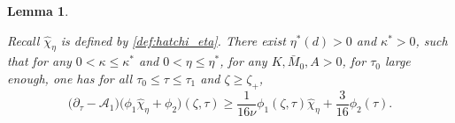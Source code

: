 \documentclass[11pt]{aims}
\newtheorem{lemma}[theorem]{Lemma}
\theoremstyle{definition}
\newcommand{\As}{\mathscr{A}}
\newcommand{\pa}{\partial}
\numberwithin{equation}{section}
\begin{document}
\begin{lemma} \label{lem:supersolutionmain}

Recall $ \hat \chi_{\eta}$ is defined by \eqref{def:hatchi_eta}. There exist $\eta^*(d)>0$ and $\kappa^*>0$, such that for any $0<\kappa\leq \kappa^*$ and $0<\eta\leq \eta^*$, for any $K,\bar M_0,A>0$, for $\tau_0$ large enough, one has for all $ \tau_0\leq \tau \leq \tau_1$ and $\zeta \geq  \zeta_+$,
\begin{equation}\label{est:Linearterms1}
\big( \pa_\tau - \As_1\big) \big(\phi_1 \hat \chi_{\eta}+ \phi_2 \big)(\zeta,\tau)  \geq  \frac{1}{16 \nu}\phi_1(\zeta, \tau) \hat \chi_{\eta} + \frac{3}{16}\phi_2(\tau).
\end{equation}

\end{lemma}
\end{document}
